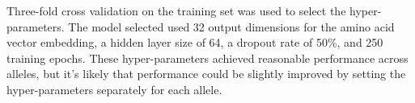 Three-fold cross validation on the training set was used to select the hyper-parameters. The model selected used 32 output dimensions for the amino acid vector embedding, a hidden layer size of 64, a dropout rate\cite{Srivastava2014} of 50\%, and 250 training epochs. These hyper-parameters achieved reasonable performance across alleles, but it's likely that performance could be slightly improved by setting the hyper-parameters separately for each allele.